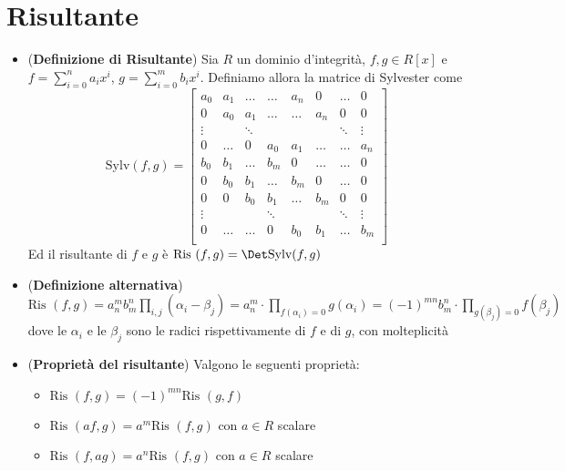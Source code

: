 \documentclass[a4paper,NoNotes,GeneralMath]{stdmdoc}
\newcommand{\Ris}{\text{Ris }}
\begin{document}
	\section*{Risultante}
	\begin{itemize}
		\item ({\bf Definizione di Risultante}) Sia $R$ un dominio d'integrità, $f, g \in R[x]$ e $f = \sum_{i=0}^n a_i x^i$, $g = \sum_{i=0}^m b_i x^i$. Definiamo allora la matrice di Sylvester come
		$$ \text{Sylv}(f, g) = \left[ \begin{array}{cccccccc}
		a_0     & a_1     & \ldots  & \ldots  & a_n     & 0       & \ldots  & 0       \\
		0       & a_0     & a_1     & \ldots  & \ldots  & a_n     & 0       & 0       \\
		\vdots  &         & \ddots  &         &         &         & \ddots  & \vdots  \\
		0       & \ldots  & 0       & a_0     & a_1     & \ldots  & \ldots  & a_n     \\ \hline
		b_0     & b_1     & \ldots  & b_m     & 0       & \ldots  & \ldots  & 0       \\
		0       & b_0     & b_1     & \ldots  & b_m     & 0       & \ldots  & 0       \\
		0       & 0       & b_0     & b_1     & \ldots  & b_m     & 0       & 0       \\
		\vdots  &         &         & \ddots  &         &         & \ddots  & \vdots  \\
		0       & \ldots  & \ldots  & 0       & b_0     & b_1     & \ldots  & b_m     \\
		\end{array} \right]$$
		Ed il risultante di $f$ e $g$ è $\Ris(f, g) = \Det \text{Sylv}(f, g)$
		\item ({\bf Definizione alternativa}) $\Ris(f, g) = a_n^m b_m^n \prod_{i,j} (\alpha_i - \beta_j) = a_n^m \cdot \prod_{f(\alpha_i) = 0} g(\alpha_i) = (-1)^{mn} b_m^n \cdot \prod_{g(\beta_j) = 0} f(\beta_j)$ dove le $\alpha_i$ e le $\beta_j$ sono le radici rispettivamente di $f$ e di $g$, con molteplicità
		\item ({\bf Proprietà del risultante}) Valgono le seguenti proprietà:
			\begin{itemize}
				\item $\Ris(f, g) = (-1)^{mn} \Ris(g, f)$
				\item $\Ris(af, g) = a^m \Ris(f, g)$ con $a \in R$ scalare
				\item $\Ris(f, ag) = a^n \Ris(f, g)$ con $a \in R$ scalare

\end{itemize}
\end{itemize}
\end{document}
